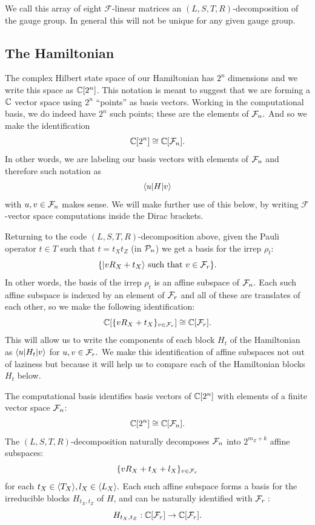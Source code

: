 \documentclass[12pt]{article}
\newcommand{\Field}{\mathcal{F}}
\renewenvironment{framed}
{\begin{samepage}
\MakeFramed{\hsize0.8\linewidth\advance\hsize-\width\FrameRestore}}
{\endMakeFramed\end{samepage}}
\begin{document}
We call this array of eight $\Field$-linear 
matrices
an $(L,S,T,R)$-decomposition of the gauge group.
In general this will not be unique for
any given gauge group.

\subsection{The Hamiltonian}

The complex Hilbert state space of our
Hamiltonian has $2^n$ dimensions and we
write this space as $\mathbb{C}[2^n]$.
This notation is meant to suggest that
we are forming a $\mathbb{C}$ vector space
using $2^n$ ``points'' 
as basis vectors.
Working in the computational basis,
we do indeed have $2^n$ such points; 
these are the elements of $\Fnd.$
And so we make the identification
$$
    \Complex[2^n] \cong \Complex[\Fnd].
$$
In other words, we are labeling 
our basis vectors with elements of $\Fnd$
and therefore such notation as
$$
    \langle{u}| H |{v}\rangle
$$
with $u, v \in \Fnd$ makes sense.
We will make further use of this below,
by writing  $\Field$-vector space 
computations inside the Dirac brackets.

Returning to the code $(L,S,T,R)$-decomposition
above,
given the Pauli operator $t\in T$ such that $t = t_X t_Z$ (in $\mathcal{P}_n$)
we get a basis for the irrep $\rho_t$:
$$
    \{ \ket{v R_X + t_X} \ \mbox{such that}\  v \in \Frd \}.
$$
In other words,
the basis of the irrep $\rho_t$ is 
an affine subspace of $\Fnd.$
Each such affine subspace is indexed by an
element of $\Frd$ and
all of these are
translates of each other,
so we make the following identification:
$$
\Complex[\{vR_X+t_X\}_{v\in\Frd}]
\cong \Complex[\Frd].
$$
This will allow us to write the components
of each block $H_t$ of the Hamiltonian
as $\langle{u}|H_t|{v}\rangle$ for $u,v\in\Frd.$
We make this identification of affine subspaces
not out of laziness but because it will
help us to compare each of
the Hamiltonian blocks $H_t$ below.

\begin{framed}
The computational basis identifies
basis vectors of $\mathbb{C}[2^n]$
with elements of a finite vector space $\Fnd$:
$$
    \Complex[2^n] \cong \Complex[\Fnd].
$$
The $(L,S,T,R)$-decomposition naturally
decomposes $\Fnd$ into $2^{m_Z+k}$ affine subspaces:
$$
    \{ v R_X + t_X + l_X \}_{v\in\Frd}
$$
for each $t_X \in \langle T_X \rangle, l_X \in \langle L_X \rangle.$
Each such affine subspace forms a basis
for the irreducible blocks $H_{t_X,t_Z}$ of $H$,
and can be naturally identified with $\Frd:$
$$
    H_{t_X,t_Z} : \Complex[\Frd] \to \Complex[\Frd].
$$
\end{framed}
\end{document}

